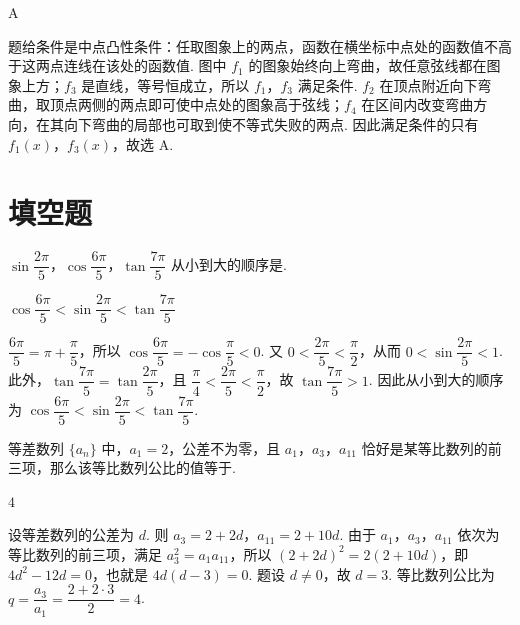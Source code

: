 \begin{answer}
A
\end{answer}

\begin{solution}
题给条件是中点凸性条件：任取图象上的两点，函数在横坐标中点处的函数值不高于这两点连线在该处的函数值. 图中 \(f_1\) 的图象始终向上弯曲，故任意弦线都在图象上方；\(f_3\) 是直线，等号恒成立，所以 \(f_1\)，\(f_3\) 满足条件. \(f_2\) 在顶点附近向下弯曲，取顶点两侧的两点即可使中点处的图象高于弦线；\(f_4\) 在区间内改变弯曲方向，在其向下弯曲的局部也可取到使不等式失败的两点. 因此满足条件的只有 \(f_1(x)\)，\(f_3(x)\)，故选 A.
\end{solution}

\section{填空题}
\begin{problem}
\(\sin\dfrac{2\pi}{5}\)，\(\cos\dfrac{6\pi}{5}\)，\(\tan\dfrac{7\pi}{5}\) 从小到大的顺序是\fillinblank{}.
\end{problem}

\begin{answer}
\(\cos\dfrac{6\pi}{5}<\sin\dfrac{2\pi}{5}<\tan\dfrac{7\pi}{5}\)
\end{answer}

\begin{solution}
\(\dfrac{6\pi}{5}=\pi+\dfrac{\pi}{5}\)，所以 \(\cos\dfrac{6\pi}{5}=-\cos\dfrac{\pi}{5}<0\). 又 \(0<\dfrac{2\pi}{5}<\dfrac{\pi}{2}\)，从而 \(0<\sin\dfrac{2\pi}{5}<1\). 此外，\(\tan\dfrac{7\pi}{5}=\tan\dfrac{2\pi}{5}\)，且 \(\dfrac{\pi}{4}<\dfrac{2\pi}{5}<\dfrac{\pi}{2}\)，故 \(\tan\dfrac{7\pi}{5}>1\). 因此从小到大的顺序为 \(\cos\dfrac{6\pi}{5}<\sin\dfrac{2\pi}{5}<\tan\dfrac{7\pi}{5}\).
\end{solution}

\begin{problem}
等差数列 \(\{a_n\}\) 中，\(a_1=2\)，公差不为零，且 \(a_1\)，\(a_3\)，\(a_{11}\) 恰好是某等比数列的前三项，那么该等比数列公比的值等于\fillinblank{}.
\end{problem}

\begin{answer}
\(4\)
\end{answer}

\begin{solution}
设等差数列的公差为 \(d\). 则 \(a_3=2+2d\)，\(a_{11}=2+10d\). 由于 \(a_1\)，\(a_3\)，\(a_{11}\) 依次为等比数列的前三项，满足 \(a_3^2=a_1a_{11}\)，所以
\((2+2d)^2=2(2+10d)\)，即 \(4d^2-12d=0\)，也就是 \(4d(d-3)=0\). 题设 \(d\ne0\)，故 \(d=3\). 等比数列公比为 \(q=\dfrac{a_3}{a_1}=\dfrac{2+2\cdot3}{2}=4\).
\end{solution}

